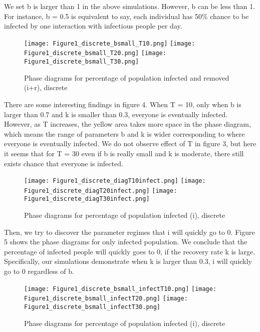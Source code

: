 \documentclass{article}
\begin{document}
We set b is larger than 1 in the above simulations. However, b can be less than 1. For instance, b = 0.5 is equivalent to say, each individual has 50$\%$ chance to be infected by one interaction with infectious people per day. 


\begin{figure}[htp]

\centering
\texttt{[image: Figure1\_discrete\_bsmall\_T10.png]}\hfill
\texttt{[image: Figure1\_discrete\_bsmall\_T20.png]}\hfill
\texttt{[image: Figure1\_discrete\_bsmall\_T30.png]}

\caption{Phase diagrams for percentage of population infected and removed (i+r), discrete}
\label{fig:figure3}

\end{figure}


There are some interesting findings in figure 4. When T = 10, only when b is larger than 0.7 and k is smaller than 0.3, everyone is eventually infected. However, as T increases, the yellow area takes more space in the phase diagram, which means the range of parameters b and k is wider corresponding to where everyone is eventually infected. We do not observe effect of T in figure 3, but here it seems that for T = 30 even if b is really small and k is moderate, there still exists chance that everyone is infected.



\begin{figure}[htp]

\centering
\texttt{[image: Figure1\_discrete\_diagT10infect.png]}\hfill
\texttt{[image: Figure1\_discrete\_diagT20infect.png]}\hfill
\texttt{[image: Figure1\_discrete\_diagT30infect.png]}

\caption{Phase diagrams for percentage of population infected (i), discrete}
\label{fig:figure3}

\end{figure}


Then, we try to discover the parameter regimes that i will quickly go to 0. Figure 5 shows the phase diagrams for only infected population. We conclude that the percentage of infected people will quickly goes to 0, if the recovery rate k is large. Specifically, our simulations demonstrate when k is larger than 0.3, i will quickly go to 0 regardless of b. 



\begin{figure}[htp]

\centering
\texttt{[image: Figure1\_discrete\_bsmall\_infectT10.png]}\hfill
\texttt{[image: Figure1\_discrete\_bsmall\_infectT20.png]}\hfill
\texttt{[image: Figure1\_discrete\_bsmall\_infectT30.png]}

\caption{Phase diagrams for percentage of population infected (i), discrete}
\label{fig:figure3}

\end{figure}
\end{document}
